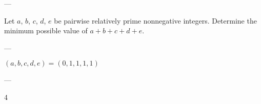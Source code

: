 
---

Let $a$, $b$, $c$, $d$, $e$ be pairwise relatively prime nonnegative integers. Determine the minimum possible value of $a+b+c+d+e$.

---

$(a,b,c,d,e)=(0,1,1,1,1)$

---

4
